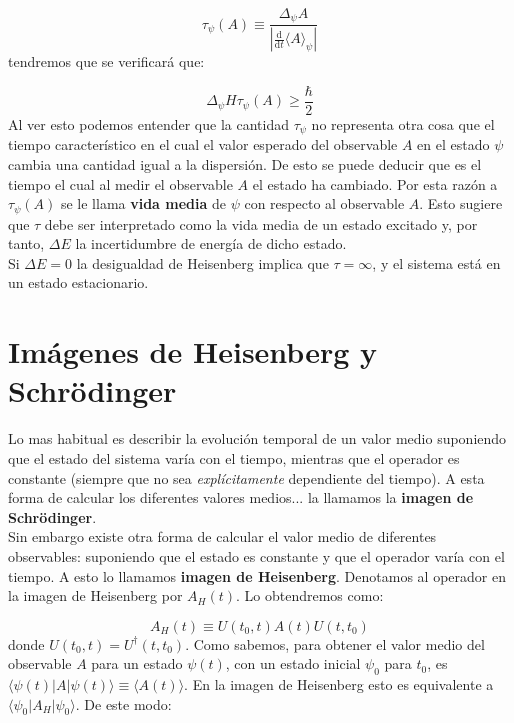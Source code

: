 \documentclass[12pt]{book}
\numberwithin{equation}{chapter}
\numberwithin{figure}{chapter}
\newcommand{\D}{\mathrm{d}}
\newcommand{\derivadas}[2]{\frac{\D #1}{\D #2}}
\begin{document}
\begin{equation}
\tau_\psi (A) \equiv \frac{\Delta_\psi A}{\left| \derivadas{}{t} \langle A \rangle_\psi \right|}
\end{equation}
tendremos que se verificará que:

\begin{equation}
\Delta_\psi H \tau_\psi (A) \geq \frac{\hbar}{2}
\end{equation}
Al ver esto podemos entender que la cantidad $\tau_\psi$ no representa otra cosa que el tiempo característico en el cual el valor esperado del observable $A$ en el estado $\psi$ cambia una cantidad igual a la dispersión. De esto se puede deducir que es el tiempo el cual al medir el observable $A$ el estado ha cambiado. Por esta razón a $\tau_\psi (A)$ se le llama \textbf{vida media} de $\psi$ con respecto al observable $A$. Esto sugiere que $\tau$ debe ser interpretado como la vida media de un estado excitado y, por tanto, $\Delta E$ la incertidumbre de energía de dicho estado. \\

Si $\Delta E =0$ la desigualdad de Heisenberg implica que $\tau = \infty$, y el sistema está en un estado estacionario. \\

\section{Imágenes de Heisenberg y Schrödinger}

Lo mas habitual es describir la evolución temporal de un valor medio suponiendo que el estado del sistema varía con el tiempo, mientras que el operador es constante (siempre que no sea \textit{explícitamente} dependiente del tiempo). A esta forma de calcular los diferentes valores medios... la llamamos la \textbf{imagen de Schrödinger}. \\

Sin embargo existe otra forma de calcular el valor medio de diferentes observables: suponiendo que el estado es constante y que el operador varía con el tiempo. A esto lo llamamos \textbf{imagen de Heisenberg}. Denotamos al operador en la imagen de Heisenberg por $A_H (t)$. Lo obtendremos como:

\begin{equation}
A_H (t) \equiv U (t_0,t) A (t) U(t,t_0) 
\end{equation}
donde $U(t_0,t) = U^\dagger (t,t_0)$. Como sabemos, para obtener el valor medio del observable $A$ para un estado $\psi (t)$, con un estado inicial $\psi_0$ para $t_0$, es  $\langle \psi (t) | A | \psi (t) \rangle  \equiv \langle A (t) \rangle $. En la imagen de Heisenberg esto es equivalente a  $\langle \psi_0 | A_H | \psi_0 \rangle $. De este modo:
\end{document}
